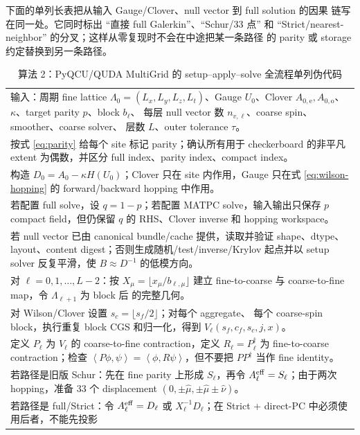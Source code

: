 \documentclass[UTF8,a4paper,11pt]{ctexart}
\newcommand{\ip}[2]{\left\langle#1,#2\right\rangle}
\newcommand{\odd}{\mathrm o}
\newcommand{\even}{\mathrm e}
\begin{document}
下面的单列长表把从输入 Gauge/Clover、null vector 到 full solution 的因果
链写在同一处。它同时标出 ``直接 full Galerkin''、``Schur/33 点'' 和
``Strict/nearest-neighbor'' 的分叉；这样从零复现时不会在中途把某一条路径
的 parity 或 storage 约定替换到另一条路径。

\begin{longtable}{@{}p{}@{}}
\caption{算法 2：PyQCU/QUDA MultiGrid 的 setup--apply--solve 全流程单列伪代码}\label{tab:long-algorithm}\\
\toprule
输入：周期 fine lattice $\Lambda_0=(L_x,L_y,L_z,L_t)$、Gauge $U_0$、Clover
$A_{0,\even},A_{0,\odd}$、$\kappa$、target parity $p$、block $b_\ell$、
每层 null vector 数 $n_{v,\ell}$、coarse spin、smoother、coarse solver、
层数 $L$、outer tolerance $\tau$。\\
按式 \eqref{eq:parity} 给每个 site 标记 parity；确认所有用于 checkerboard
的非平凡 extent 为偶数，并区分 full index、parity index、compact index。\\
构造 $D_0=A_0-\kappa H(U_0)$；Clover 只在 site 内作用，Gauge 只在式
\eqref{eq:wilson-hopping} 的 forward/backward hopping 中作用。\\
若配置 full solve，设 $q=1-p$；若配置 MATPC solve，输入输出只保存 $p$
compact field，但仍保留 $q$ 的 RHS、Clover inverse 和 hopping workspace。\\
若 null vector 已由 canonical bundle/cache 提供，读取并验证 shape、dtype、
layout、content digest；否则生成随机/test/inverse/Krylov 起点并以 setup
solver 反复平滑，使 $B\approx D^{-1}$ 的低模方向。\\
对 $\ell=0,1,\ldots,L-2$：按 $X_\mu=\lfloor x_\mu/b_{\ell,\mu}\rfloor$
建立 fine-to-coarse 与 coarse-to-fine map，令 $\Lambda_{\ell+1}$ 为 block 后
的完整几何。\\
对 Wilson/Clover 设置 $s_c=\lfloor s_f/2\rfloor$；对每个 aggregate、
每个 coarse-spin block，执行重复 block CGS 和归一化，得到
$V_\ell(s_f,c_f,s_c,j,x)$。\\
定义 $P_\ell$ 为 $V_\ell$ 的 coarse-to-fine contraction，定义
$R_\ell=P_\ell^\dagger$ 为 fine-to-coarse contraction；检查
$\ip{P\phi}{\psi}=\ip{\phi}{R\psi}$，但不要把 $PP^\dagger$ 当作 fine identity。\\
若路径是旧版 Schur：先在 fine parity 上形成 $S_\ell$，再令
$A_\ell^{\rm eff}=S_\ell$；由于两次 hopping，准备 33 个 displacement
$(0,\pm\hat\mu,\pm\hat\mu\pm\hat\nu)$。\\
若路径是 full/Strict：令 $A_\ell^{\rm eff}=D_\ell$ 或
$X_\ell^{-1}D_\ell$；在 Strict + direct-PC 中必须使用后者，不能先投影

\end{longtable}
\end{document}
